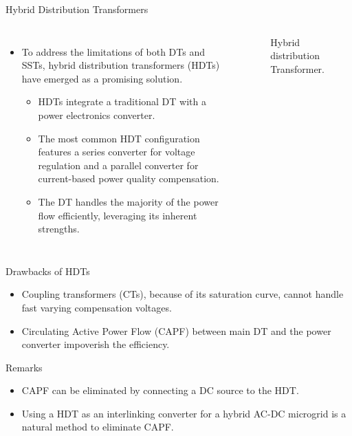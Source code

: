 \begin{frame}{Hybrid Distribution Transformers}
    \begin{columns}
            \begin{itemize}
                \item To address the limitations of both DTs and SSTs, hybrid distribution transformers (HDTs) have emerged as a promising solution.
                \begin{itemize}
                    \item HDTs integrate a traditional DT with a power electronics converter.
                    \item The most common HDT configuration features a series converter for voltage regulation and a parallel converter for current-based power quality compensation.
                    \item The DT handles the majority of the power flow efficiently, leveraging its inherent strengths.
                \end{itemize}
            \end{itemize}
            \begin{figure}
                \centering
                \resizebox{!}{5.3cm}{}
                \caption{Hybrid distribution Transformer.}
                \label{fig:HDT}
            \end{figure}
    \end{columns}
\end{frame}

\begin{frame}{Drawbacks of HDTs}
    \begin{itemize}
        \item Coupling transformers (CTs), because of its saturation curve, cannot handle fast varying compensation voltages.
        \item Circulating Active Power Flow (CAPF) between main DT and the power converter impoverish the efficiency.
    \end{itemize}
    \begin{exampleblock}{Remarks}
        \begin{itemize}
            \item CAPF can be eliminated by connecting a DC source to the HDT.
            \item Using a HDT as an interlinking converter for a hybrid AC-DC microgrid is a natural method to eliminate CAPF.
        \end{itemize}
    \end{exampleblock}
\end{frame}

